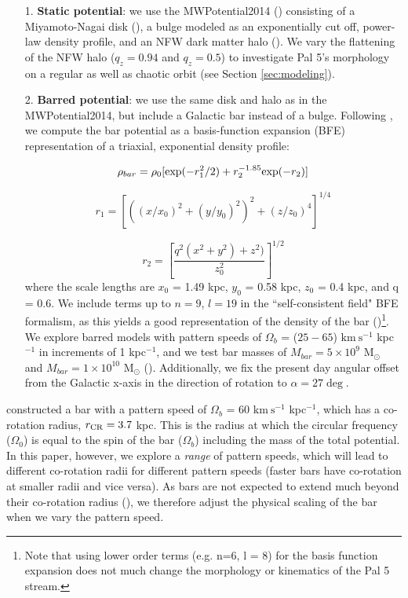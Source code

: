 \documentclass[modern]{aastex62}
\newcommand{\msun}{\textrm{M}_\odot}
\newcommand{\kms}{\ensuremath{\textrm{km}~\textrm{s}^{-1}}}
\begin{document}
\begin{itemize}
\item[1.] {\bf Static potential}: we use the {\small MWPotential2014} (\citealt{Bovy:2015}) consisting of a Miyamoto-Nagai disk (\citealt{Miyamoto:1975}), a bulge modeled as an exponentially cut off, power-law density profile, and an NFW dark matter halo (\citealt{Navarro:1996}). We vary the flattening of the NFW halo ($q_z = 0.94$ and $q_z = 0.5$) to investigate Pal 5's morphology on a regular as well as chaotic orbit (see Section \ref{sec:modeling}). 

\item[2.] {\bf  Barred potential}: we use the same disk and halo as in the {\small MWPotential2014}, but include a Galactic bar instead of a bulge. Following \citet{wang:2012}, we compute the bar potential as a basis-function expansion (BFE) representation of a triaxial, exponential density profile:

\begin{equation}
\rho_{bar} = \rho_0 [{\rm exp} (-r^2_1/2) + r_2^{-1.85} {\rm exp}(-r_2) ]
\end{equation}

\begin{equation}
r_1 = \left[\left((x/x_0)^2 + (y/y_0)^2\right)^2 +( z/z_0)^4\right]^{1/4}
\end{equation}

\begin{equation}
r_2 = \left[\frac{q^2(x^2 + y^2) + z^2)}{z_0^2}\right]^{1/2}
\end{equation}
where the scale lengths are $x_0$ = 1.49 kpc, $y_0$ = 0.58 kpc, $z_0$ = 0.4 kpc, and q = 0.6. We include terms up to $n=9$, $l=19$ in the ``self-consistent field" BFE formalism, as this yields a good representation of the density of the bar (\citealt{Banik:2019})\footnote{Note that using lower order terms (e.g. n=6, l = 8) for the basis function expansion does not much change the morphology or kinematics of the Pal 5 stream.}. We explore barred models with pattern speeds of $\Omega_b$ = ($25 - 65$) $\kms$ kpc$^{-1}$ in increments of 1 kpc$^{-1}$, and  we test bar masses of $M_{bar} = 5 \times 10^{9}$ $\msun$ and $M_{bar} = 1 \times 10^{10}$ $\msun$ (\citealt{Portail:2017}). Additionally, we fix the present day angular offset from the Galactic x-axis in the direction of rotation to $\alpha = 27\deg$.
\end{itemize}

\citet{wang:2012} constructed a bar with a pattern speed of $\Omega_b$ =  60 $\kms$ kpc$^{-1}$, which has a co-rotation radius, $r_{\rm CR} = 3.7$ kpc. This is the radius at which the circular frequency ($\Omega_0$) is equal to the spin of the bar ($\Omega_b$) including the mass of the total potential. In this paper, however, we explore a {\it range} of pattern speeds, which will lead to different co-rotation radii for different pattern speeds (faster bars have co-rotation at smaller radii and vice versa).  As bars are not expected to extend much beyond their co-rotation radius (\citealt{binney:2008}), we therefore adjust the physical scaling of the bar when we vary the pattern speed. %
\end{document}
